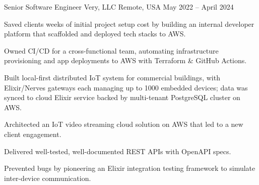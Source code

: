 \begin{cventries}
	\cventry
	{Senior Software Engineer} %
	{Very, LLC} %
	{Remote, USA} %
	{May 2022 -- April 2024} %
	{
		\begin{cvitems}
			\item Saved clients weeks of initial project setup cost by building an
			internal developer platform that scaffolded and deployed tech stacks to
			AWS.
			\item Owned CI/CD for a cross-functional team, automating infrastructure
			provisioning and app deployments to AWS with Terraform \& GitHub
			Actions.
			\item Built local-first distributed IoT system for commercial buildings,
			with Elixir/Nerves gateways each managing up to 1000 embedded devices;
			data was synced to cloud Elixir service backed by multi-tenant PostgreSQL
			cluster on AWS.
			\item Architected an IoT video streaming cloud solution on AWS that
			led to a new client engagement.
			\item Delivered well-tested, well-documented REST APIs with OpenAPI specs.
			\columnbreak
			\item Prevented bugs by pioneering an Elixir integration testing framework
			to simulate inter-device communication.

\end{cvitems}}
\end{cventries}
